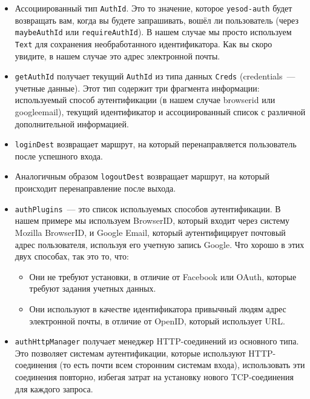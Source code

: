 \begin{itemize}
    \item Ассоциированный тип \lstinline'AuthId'. Это то значение, которое \lstinline'yesod-auth' будет возвращать вам, когда вы будете запрашивать, вошёл ли пользователь (через \lstinline'maybeAuthId' или \lstinline'requireAuthId'). В нашем случае мы просто используем \lstinline'Text' для сохранения необработанного идентификатора. Как вы скоро увидите, в нашем случае это адрес электронной почты. 

    \item \lstinline'getAuthId' получает текущий \lstinline'AuthId' из типа данных \lstinline'Creds' (credentials~--- учетные данные). Этот тип содержит три фрагмента информации: используемый способ аутентификации (в нашем случае browserid или googleemail), текущий идентификатор и ассоциированный список с различной дополнительной информацией.

    \item \lstinline'loginDest' возвращает маршрут, на который перенаправляется пользователь после успешного входа.

    \item Аналогичным образом \lstinline'logoutDest' возвращает маршрут, на который происходит перенаправление после выхода. 

    \item \lstinline'authPlugins'~--- это список используемых способов аутентификации. В нашем примере мы используем BrowserID, который входит через систему Mozilla BrowserID, и Google Email, который аутентифицирует почтовый адрес пользователя, используя его учетную запись Google. Что хорошо в этих двух способах, так это то, что:
    
    \begin{itemize}
        \item Они не требуют установки, в отличие от Facebook или OAuth, которые требуют задания учетных данных.
        
        \item Они используют в качестве идентификатора привычный людям адрес электронной почты, в отличие от OpenID, который использует URL. 
    \end{itemize}
    
    \item \lstinline'authHttpManager' получает менеджер HTTP-соединений из основного типа. Это позволяет системам аутентификации, которые используют HTTP-соединения (то есть почти всем сторонним системам входа), использовать эти соединения повторно, избегая затрат на установку нового TCP-соединения для каждого запроса.
\end{itemize}

